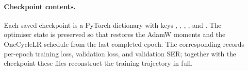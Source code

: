 \paragraph{Checkpoint contents.}
Each saved checkpoint is a PyTorch dictionary with keys
, ,
, , and .  The optimiser
state is preserved so that  restores the AdamW
moments and the OneCycleLR schedule from the last completed epoch.
The corresponding  records per-epoch
training loss, validation loss, and validation SER; together with
the checkpoint these files reconstruct the training trajectory in
full.
